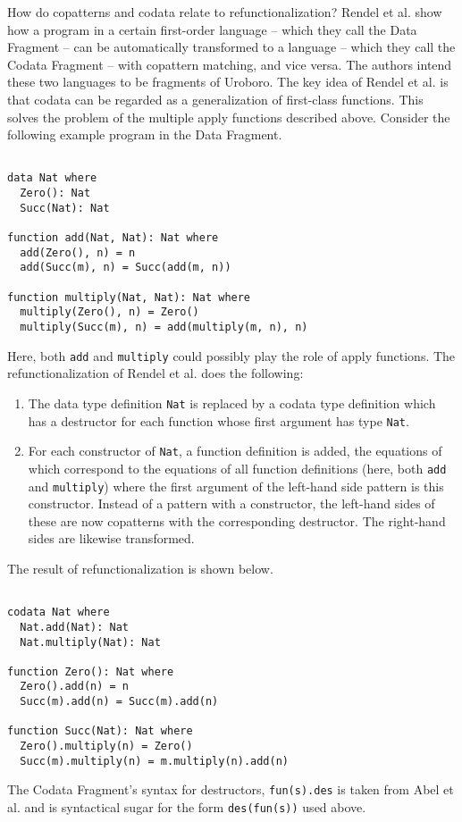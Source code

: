 How do copatterns and codata relate to refunctionalization? Rendel et al.\cite{rendel15automatic} show how a program in a certain first-order language -- which they call the Data Fragment -- can be automatically transformed to a language -- which they call the Codata Fragment -- with copattern matching, and vice versa. The authors intend these two languages to be fragments of Uroboro. The key idea of Rendel et al. is that codata can be regarded as a generalization of first-class functions. This solves the problem of the multiple apply functions described above. Consider the following example program in the Data Fragment.

\begin{lstlisting}

data Nat where
  Zero(): Nat
  Succ(Nat): Nat

function add(Nat, Nat): Nat where
  add(Zero(), n) = n
  add(Succ(m), n) = Succ(add(m, n))

function multiply(Nat, Nat): Nat where
  multiply(Zero(), n) = Zero()
  multiply(Succ(m), n) = add(multiply(m, n), n)

\end{lstlisting}

Here, both \texttt{add} and \texttt{multiply} could possibly play the role of apply functions. The refunctionalization of Rendel et al. does the following:
\begin{enumerate}
\item The data type definition \texttt{Nat} is replaced by a codata type definition which has a destructor for each function whose first argument has type \texttt{Nat}.
\item For each constructor of \texttt{Nat}, a function definition is added, the equations of which correspond to the equations of all function definitions (here, both \texttt{add} and \texttt{multiply}) where the first argument of the left-hand side pattern is this constructor. Instead of a pattern with a constructor, the left-hand sides of these are now copatterns with the corresponding destructor. The right-hand sides are likewise transformed.
\end{enumerate}
The result of refunctionalization is shown below.

\begin{lstlisting}

codata Nat where
  Nat.add(Nat): Nat
  Nat.multiply(Nat): Nat

function Zero(): Nat where
  Zero().add(n) = n
  Succ(m).add(n) = Succ(m).add(n)

function Succ(Nat): Nat where
  Zero().multiply(n) = Zero()
  Succ(m).multiply(n) = m.multiply(n).add(n)

\end{lstlisting}
The Codata Fragment's syntax for destructors, \texttt{fun(s).des} is taken from Abel et al.\cite{abel13copatterns} and is syntactical sugar for the form \texttt{des(fun(s))} used above.

